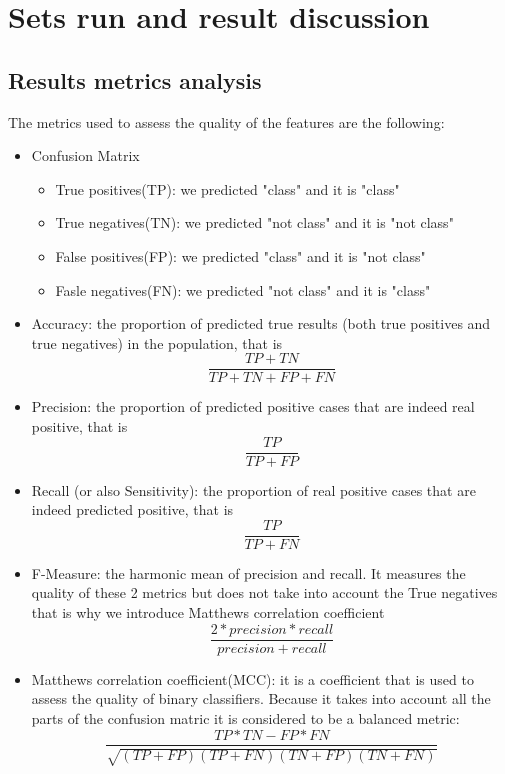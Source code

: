 
\chapter{Sets run and result discussion} %
\label{Sets run and result discussion} %

\section{Results metrics analysis}
The metrics used to assess the quality of the features are the following:
\begin{itemize}
\item Confusion Matrix
\begin{itemize}
\item True positives(TP): we predicted "class" and it is "class"
\item True negatives(TN): we predicted "not class" and it is "not class"
\item False positives(FP): we predicted "class" and it is "not class"
\item Fasle negatives(FN): we predicted "not class" and it is "class"
\end{itemize}
\item Accuracy: the proportion of predicted true results (both true positives and true negatives) in the population, that is 
\begin{equation}
\frac{TP+TN}{TP+TN+FP+FN}
\end{equation}
\item Precision: the proportion of predicted positive cases that are indeed real positive, that is 
 \begin{equation}
\frac{TP}{TP+FP}
 \end{equation}
\item Recall (or also Sensitivity): the proportion of real positive cases that are indeed predicted positive, that is 
\begin{equation}
\frac{TP}{TP+FN}
\end{equation}
\item F-Measure: the harmonic mean of precision and recall. It measures the quality of these 2 metrics but does not take into account the True negatives that is why we introduce Matthews correlation coefficient
\begin{equation}
\frac{2*precision*recall}{precision+recall}
\end{equation}
\item Matthews correlation coefficient(MCC): it is a coefficient that is used to assess the quality of binary classifiers. Because it takes into account all the parts of the confusion matric it is considered to be a balanced metric: 
\begin{equation}
\frac{TP*TN - FP*FN}{\sqrt{(TP+FP)(TP+FN)(TN+FP)(TN+FN)}}
\end{equation}
\end{itemize}

